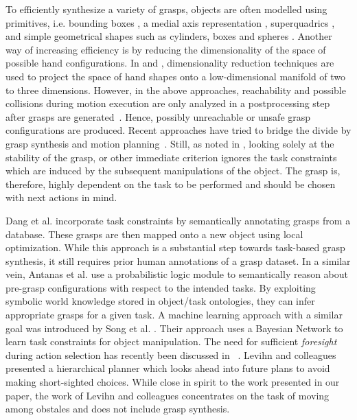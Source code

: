 \documentclass{aamas2015}
\begin{document}
To efficiently synthesize a 
variety of grasps, objects are often modelled
using primitives, i.e. bounding boxes \cite{huebner2008selection}, a medial axis
representation \cite{przybylski2010unions}, superquadrics \cite{goldfeder2007grasp}, 
and simple geometrical shapes such as cylinders, boxes and spheres \cite{miller2003automatic}.
Another way of increasing efficiency is by reducing the dimensionality of
the space of possible hand configurations. In \cite{ciocarlie} and \cite{benamor}, 
dimensionality reduction techniques are used to project the space of
hand shapes onto a low-dimensional manifold of two to three dimensions.
However, in the above approaches, reachability and possible collisions
during motion execution are only analyzed in a postprocessing step after 
grasps are generated~\cite{something}. Hence, possibly unreachable or unsafe grasp configurations 
are produced. Recent approaches have tried to bridge the divide by grasp synthesis
and motion planning~\cite{vahrenkamp}. Still, as noted in \cite{dang}, 
looking solely at the stability of the grasp, or other
immediate criterion ignores the task constraints which 
are induced by the subsequent manipulations of the object. 
The grasp is, therefore, highly dependent on the task 
to be performed and should be chosen with next actions in mind.

Dang et al. \cite{dang} incorporate task constraints by 
semantically annotating grasps from a database. These grasps
are then mapped onto a new object using local optimization.
While this approach is a substantial step towards task-based
grasp synthesis, it still requires prior human annotations of 
a grasp dataset. In a similar vein, Antanas et al. \cite{antanas} 
use a probabilistic logic module to semantically reason
about pre-grasp configurations with respect to the intended tasks.
By exploiting symbolic world knowledge stored in object/task ontologies,
they can infer appropriate grasps for a given task. 
A machine learning approach with a similar goal
was introduced by Song et al. \cite{song}. Their approach 
uses a Bayesian Network to learn task constraints for 
object manipulation. The need for sufficient \emph{foresight} 
during action selection has recently been discussed in ~\cite{levihn}. Levihn and colleagues
presented a hierarchical planner which looks ahead into future plans to 
avoid making short-sighted choices. While close in spirit to the 
work presented in our paper, the work of Levihn and colleagues 
concentrates on the task of moving among obstales and does not 
include grasp synthesis.
\end{document}
